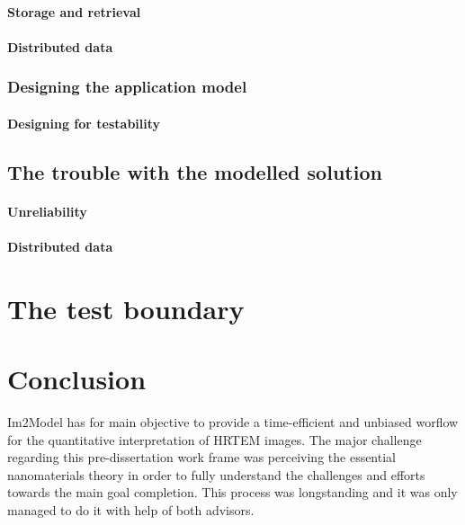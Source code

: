 \documentclass[
  oneside,
  11pt, a4paper,
  footinclude=true,
  headinclude=true,
  cleardoublepage=empty
]{scrbook}
\begin{document}
		    \subsubsection{Storage and retrieval}
		    \subsubsection{Distributed data}
		    		    \subsection{Designing the application model}

		      \subsubsection{Designing for testability}
		      
		      
		    \section{The trouble with the modelled solution}
		    \subsubsection{Unreliability}
		    \subsubsection{Distributed data}
		    
		    

\chapter{The test boundary}

	\chapter{Conclusion}


Im2Model has for main objective to provide a time-efficient and unbiased worflow for the quantitative interpretation of HRTEM images. The major challenge regarding this pre-dissertation work frame was perceiving the essential nanomaterials theory in order to fully understand the challenges and efforts towards the main goal completion. This process was longstanding and it was only managed
to do it with help of both advisors.\par 
\end{document}
